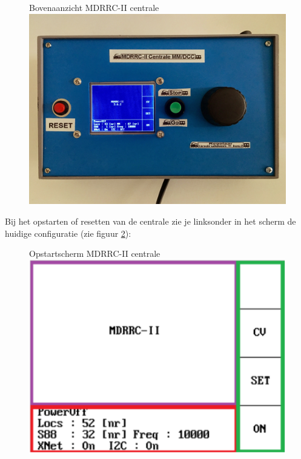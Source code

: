 \documentclass[12pt,a4paper]{report}
\begin{document}
\begin{figure}[!ht]
  \captionbox
  {Bovenaanzicht MDRRC-II centrale\label{centrale}}
  {\includegraphics[scale=0.1]{images/rcu_foto1}}\\
\end{figure}

Bij het opstarten of resetten van de centrale zie je linksonder in het scherm de huidige configuratie (zie figuur \ref{rcu-foto4}):

\begin{figure}[!ht]
  \captionbox
  {Opstartscherm MDRRC-II centrale\label{rcu-foto4}}
  {\includegraphics[scale=0.6]{images/rcu_foto4}}\\
\end{figure}
\end{document}
